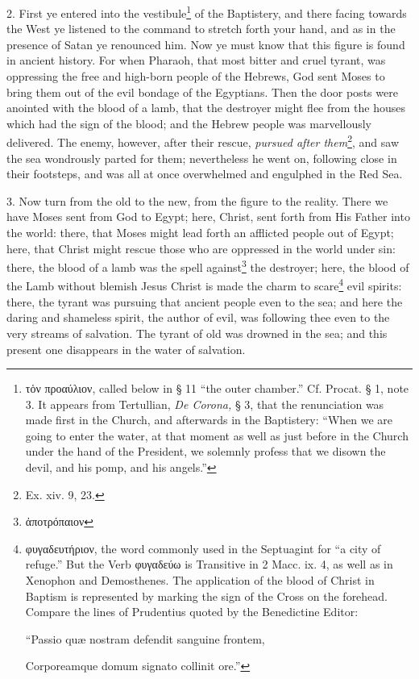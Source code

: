 2. First ye entered into the vestibule\footnote{\textgreek{τὁν προαύλιον}, called below in § 11 “the outer chamber.” Cf. Procat. § 1, note 3. It appears from Tertullian, \emph{De Corona,} § 3, that the renunciation was made first in the Church, and afterwards in the Baptistery: “When we are going to enter the water, at that moment as well as just before in the Church under the hand of the President, we solemnly profess that we disown the devil, and his pomp, and his angels.”} of the Baptistery, and there facing towards the West ye listened to the command to stretch forth your hand, and as in the presence of Satan ye renounced him. Now ye must know that this figure is found in ancient history. For when Pharaoh, that most bitter and cruel tyrant, was oppressing the free and high-born people of the Hebrews, God sent Moses to bring them out of the evil bondage of the Egyptians. Then the door posts were anointed with the blood of a lamb, that the destroyer might flee from the houses which had the sign of the blood; and the Hebrew people was marvellously delivered. The enemy, however, after their rescue, \emph{pursued after them}\footnote{Ex. xiv. 9, 23.}, and saw the sea wondrously parted for them; nevertheless he went on, following close in their footsteps, and was all at once overwhelmed and engulphed in the Red Sea.

3. Now turn from the old to the new, from the figure to the reality. There we have Moses sent from God to Egypt; here, Christ, sent forth from His Father into the world: there, that Moses might lead forth an afflicted people out of Egypt; here, that Christ might rescue those who are oppressed in the world under sin: there, the blood of a lamb was the spell against\footnote{\textgreek{ἀποτρόπαιον}} the destroyer; here, the blood of the Lamb without blemish Jesus Christ is made the charm to scare\footnote{\textgreek{φυγαδευτήριον}, the word commonly used in the Septuagint for “a city of refuge.” But the Verb \textgreek{φυγαδεύω} is Transitive in 2 Macc. ix. 4, as well as in Xenophon and Demosthenes. The application of the blood of Christ in Baptism is represented by marking the sign of the Cross on the forehead. Compare the lines of Prudentius quoted by the Benedictine Editor: \par “Passio quæ nostram defendit sanguine frontem, \par Corporeamque domum signato collinit ore.”} evil spirits: there, the tyrant was pursuing that ancient people even to the sea; and here the daring and shameless spirit, the author of evil, was following thee even to the very streams of salvation. The tyrant of old was drowned in the sea; and this present one disappears in the water of salvation.

